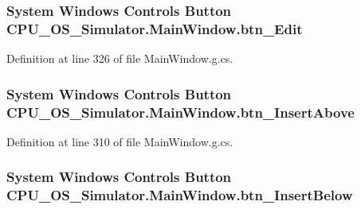\subsubsection[{btn\+\_\+\+Edit}]{\setlength{\rightskip}{0pt plus 5cm}System Windows Controls Button C\+P\+U\+\_\+\+O\+S\+\_\+\+Simulator.\+Main\+Window.\+btn\+\_\+\+Edit\hspace{0.3cm}{\ttfamily [package]}}\label{class_c_p_u___o_s___simulator_1_1_main_window_ae07013ea273fb1e9f38fd1dd83144371}


Definition at line 326 of file Main\+Window.\+g.\+cs.

\hypertarget{class_c_p_u___o_s___simulator_1_1_main_window_a23c681375b103d2294ac79c51f1fb406}{}
\subsubsection[{btn\+\_\+\+Insert\+Above}]{\setlength{\rightskip}{0pt plus 5cm}System Windows Controls Button C\+P\+U\+\_\+\+O\+S\+\_\+\+Simulator.\+Main\+Window.\+btn\+\_\+\+Insert\+Above\hspace{0.3cm}{\ttfamily [package]}}\label{class_c_p_u___o_s___simulator_1_1_main_window_a23c681375b103d2294ac79c51f1fb406}


Definition at line 310 of file Main\+Window.\+g.\+cs.

\hypertarget{class_c_p_u___o_s___simulator_1_1_main_window_a7c6c417d0bd3af11e77f86cf2cfb03fe}{}
\subsubsection[{btn\+\_\+\+Insert\+Below}]{\setlength{\rightskip}{0pt plus 5cm}System Windows Controls Button C\+P\+U\+\_\+\+O\+S\+\_\+\+Simulator.\+Main\+Window.\+btn\+\_\+\+Insert\+Below\hspace{0.3cm}{\ttfamily [package]}}\label{class_c_p_u___o_s___simulator_1_1_main_window_a7c6c417d0bd3af11e77f86cf2cfb03fe}


